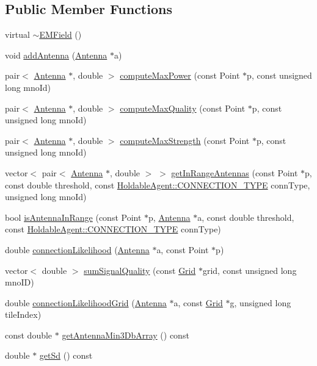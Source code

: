 \subsection*{Public Member Functions}
\begin{DoxyCompactItemize}
\item 
virtual \mbox{\hyperlink{class_e_m_field_abe7db07a27a120858107d5efa5f14edb}{$\sim$\+E\+M\+Field}} ()
\item 
void \mbox{\hyperlink{class_e_m_field_ac531ecbce4c81aa5da19fe3c734a585c}{add\+Antenna}} (\mbox{\hyperlink{class_antenna}{Antenna}} $\ast$a)
\item 
pair$<$ \mbox{\hyperlink{class_antenna}{Antenna}} $\ast$, double $>$ \mbox{\hyperlink{class_e_m_field_a01cfb9fea3dadfcfe5d6f00551193acd}{compute\+Max\+Power}} (const Point $\ast$p, const unsigned long mno\+Id)
\item 
pair$<$ \mbox{\hyperlink{class_antenna}{Antenna}} $\ast$, double $>$ \mbox{\hyperlink{class_e_m_field_ac866f6224e34895a0ee085c4baf43a01}{compute\+Max\+Quality}} (const Point $\ast$p, const unsigned long mno\+Id)
\item 
pair$<$ \mbox{\hyperlink{class_antenna}{Antenna}} $\ast$, double $>$ \mbox{\hyperlink{class_e_m_field_a9a3cdbca4fcf408ce58a30fb98de1bbb}{compute\+Max\+Strength}} (const Point $\ast$p, const unsigned long mno\+Id)
\item 
vector$<$ pair$<$ \mbox{\hyperlink{class_antenna}{Antenna}} $\ast$, double $>$ $>$ \mbox{\hyperlink{class_e_m_field_a2ad800417b06a62e68edd1fccb5c4b93}{get\+In\+Range\+Antennas}} (const Point $\ast$p, const double threshold, const \mbox{\hyperlink{class_holdable_agent_ae2c334b004d7b9c5a999cf2618e4e518}{Holdable\+Agent\+::\+C\+O\+N\+N\+E\+C\+T\+I\+O\+N\+\_\+\+T\+Y\+PE}} conn\+Type, unsigned long mno\+Id)
\item 
bool \mbox{\hyperlink{class_e_m_field_a5cd43aded41779d2d24de3f3e5c717d0}{is\+Antenna\+In\+Range}} (const Point $\ast$p, \mbox{\hyperlink{class_antenna}{Antenna}} $\ast$a, const double threshold, const \mbox{\hyperlink{class_holdable_agent_ae2c334b004d7b9c5a999cf2618e4e518}{Holdable\+Agent\+::\+C\+O\+N\+N\+E\+C\+T\+I\+O\+N\+\_\+\+T\+Y\+PE}} conn\+Type)
\item 
double \mbox{\hyperlink{class_e_m_field_a710da64db53718cdeed7b8c8dc11bba3}{connection\+Likelihood}} (\mbox{\hyperlink{class_antenna}{Antenna}} $\ast$a, const Point $\ast$p)
\item 
vector$<$ double $>$ \mbox{\hyperlink{class_e_m_field_a4995bf4b93c09f12b7aab64c7eb24603}{sum\+Signal\+Quality}} (const \mbox{\hyperlink{class_grid}{Grid}} $\ast$grid, const unsigned long mno\+ID)
\item 
double \mbox{\hyperlink{class_e_m_field_a533effeee35a80746ea7e3ddc5998e48}{connection\+Likelihood\+Grid}} (\mbox{\hyperlink{class_antenna}{Antenna}} $\ast$a, const \mbox{\hyperlink{class_grid}{Grid}} $\ast$g, unsigned long tile\+Index)
\item 
const double $\ast$ \mbox{\hyperlink{class_e_m_field_ab2132484b9c52f2224bc81f354b24df6}{get\+Antenna\+Min3\+Db\+Array}} () const
\item 
double $\ast$ \mbox{\hyperlink{class_e_m_field_a0fea003948a67df01174480480376169}{get\+Sd}} () const
\end{DoxyCompactItemize}
